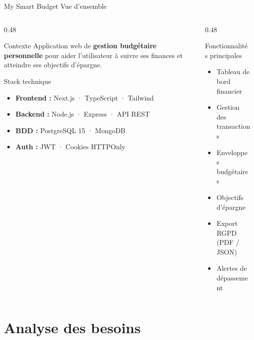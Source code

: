 \documentclass[aspectratio=169]{beamer}
\begin{document}
\begin{frame}{My Smart Budget  Vue d'ensemble}
  \begin{columns}[t]
    \begin{column}{0.48\textwidth}
      \begin{block}{Contexte}
        Application web de \textbf{gestion budgétaire personnelle} pour aider l'utilisateur à suivre ses finances et atteindre ses objectifs d'épargne.
      \end{block}
      \vspace{0.4cm}
      \begin{block}{Stack technique}
        \begin{itemize}
          \item \textbf{Frontend :} Next.js · TypeScript · Tailwind
          \item \textbf{Backend :} Node.js · Express · API REST
          \item \textbf{BDD :} PostgreSQL 15 · MongoDB
          \item \textbf{Auth :} JWT · Cookies HTTPOnly
        \end{itemize}
      \end{block}
    \end{column}
    \begin{column}{0.48\textwidth}
      \begin{block}{Fonctionnalités principales}
        \begin{itemize}
          \item[\textcolor{accent}{\faCheck}] Tableau de bord financier
          \item[\textcolor{accent}{\faCheck}] Gestion des transactions
          \item[\textcolor{accent}{\faCheck}] Enveloppes budgétaires
          \item[\textcolor{accent}{\faCheck}] Objectifs d'épargne
          \item[\textcolor{accent}{\faCheck}] Export RGPD (PDF / JSON)
          \item[\textcolor{accent}{\faCheck}] Alertes de dépassement
        \end{itemize}
      \end{block}
    \end{column}
  \end{columns}
\end{frame}

\section{Analyse des besoins}
\end{document}
